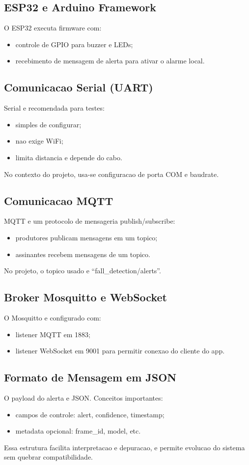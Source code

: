 \subsection{ESP32 e Arduino Framework}
O ESP32 executa firmware com:
\begin{itemize}
  \item controle de GPIO para buzzer e LEDs;
  \item recebimento de mensagem de alerta para ativar o alarme local.
\end{itemize}

\subsection{Comunicacao Serial (UART)}
Serial e recomendada para testes:
\begin{itemize}
  \item simples de configurar;
  \item nao exige WiFi;
  \item limita distancia e depende do cabo.
\end{itemize}
No contexto do projeto, usa-se configuracao de porta COM e baudrate.

\subsection{Comunicacao MQTT}
MQTT e um protocolo de mensageria publish/subscribe:
\begin{itemize}
  \item produtores publicam mensagens em um topico;
  \item assinantes recebem mensagens de um topico.
\end{itemize}
No projeto, o topico usado e ``fall\_detection/alerts''.

\subsection{Broker Mosquitto e WebSocket}
O Mosquitto e configurado com:
\begin{itemize}
  \item listener MQTT em 1883;
  \item listener WebSocket em 9001 para permitir conexao do cliente do app.
\end{itemize}

\subsection{Formato de Mensagem em JSON}
O payload do alerta e JSON. Conceitos importantes:
\begin{itemize}
  \item campos de controle: alert, confidence, timestamp;
  \item metadata opcional: frame\_id, model, etc.
\end{itemize}
Essa estrutura facilita interpretacao e depuracao, e permite evolucao do sistema sem quebrar compatibilidade.

